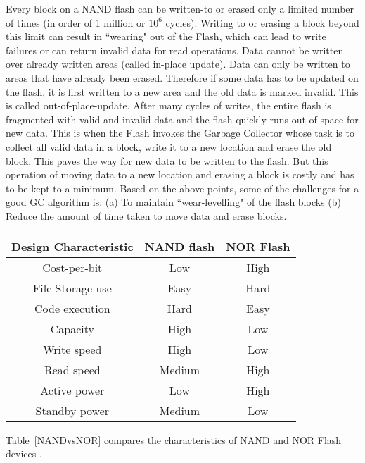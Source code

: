 Every block on a NAND flash can be written-to or erased only a limited number of times (in order of 1 million or $10^6$ cycles). Writing to or erasing a block beyond this limit can result in ``wearing" out of the Flash, which can lead to write failures or can return invalid data for read operations. Data cannot be written over already written areas (called in-place update). Data can only be written to areas that have already been erased. Therefore if some data has to be updated on the flash, it is first written to a new area and the old data is marked invalid. This is called out-of-place-update. After many cycles of writes, the entire flash is fragmented with valid and invalid data and the flash quickly runs out of space for new data. This is when the Flash invokes the Garbage Collector whose task is to collect all valid data in a block, write it to a new location and erase the old block. This paves the way for new data to be written to the flash. But this operation of moving data to a new location and erasing a block is costly and has to be kept to a minimum. Based on the above points, some of the challenges for a good GC algorithm is: (a) To maintain ``wear-levelling" of the flash blocks (b) Reduce the amount of time taken to move data and erase blocks.

\begin{center}
   \begin{tabular} {|  c | c | c | }
       \hline
	{\bf Design Characteristic} & {\bf NAND flash} & {\bf NOR Flash} \\ \hline
	Cost-per-bit & Low & High \\ \hline
	File Storage use & Easy & Hard \\ \hline
	Code execution & Hard & Easy\\ \hline
	Capacity & High & Low\\ \hline
	Write speed & High & Low\\ \hline
	Read speed & Medium & High\\ \hline
	Active power & Low & High\\ \hline
	Standby power & Medium & Low\\
       \hline
   \end{tabular}
\end{center}

Table~\ref{NANDvsNOR} compares the characteristics of NAND and NOR Flash devices \cite{Toshiba}. 
\\


